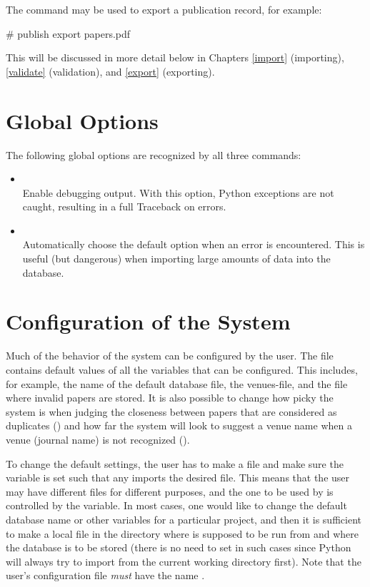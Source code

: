The command  may be used to export a publication record,
for example:

\begin{code}
# publish export papers.pdf
\end{code}

This will be discussed in more detail below in Chapters \ref{import}
(importing), \ref{validate} (validation), and \ref{export}
(exporting).

\section{Global Options}

The following global options are recognized by all three commands:
\begin{itemize}
\item
   \\

  Enable debugging output. With this option, Python exceptions are not
  caught, resulting in a full Traceback on errors.
\item
   \\

  Automatically choose the default option when an error is
  encountered. This is useful (but dangerous) when importing large
  amounts of data into the database.
\end{itemize}

\section{Configuration of the System}

Much of the behavior of the system can be configured by the user.
The file  contains default values of
all the variables that can be configured.
This includes, for example, the
name of the default database file, the venues-file, and the file where
invalid papers are stored.  It is also possible to change how picky
the system is when judging the closeness between papers that are
considered as duplicates () and how
far the system will look to suggest a venue name when a venue (journal
name) is not recognized ().

To change the default settings, the user has to make a file
 and make sure the  variable
is set such that any  imports the desired
file. This means that the user may have different 
files for different purposes, and the one to be used by \package{}
is controlled by the  variable. In most cases, one
would like to change the default database name or other variables for
a particular project, and then it is sufficient to make
a local  file in the directory where \package{}
is supposed to be run from and where the database is to be stored
(there is no need to set  in such cases
since Python will always try
to import from the current
working directory first). Note that the user's configuration file
\emph{must} have the name .

